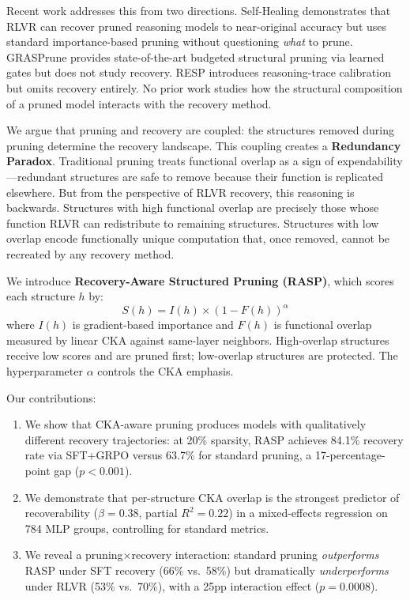 \documentclass[11pt,a4paper]{article}
\newcommand{\method}{RASP}
\newcommand{\score}{S(h)}
\newcommand{\importance}{I(h)}
\newcommand{\overlap}{F(h)}
\begin{document}
Recent work addresses this from two directions. Self-Healing \cite{selfhealing2025} demonstrates that RLVR can recover pruned reasoning models to near-original accuracy but uses standard importance-based pruning without questioning \emph{what} to prune. GRASPrune \cite{graspprune2026} provides state-of-the-art budgeted structural pruning via learned gates but does not study recovery. RESP \cite{resp2025} introduces reasoning-trace calibration but omits recovery entirely. No prior work studies how the structural composition of a pruned model interacts with the recovery method.

We argue that pruning and recovery are coupled: the structures removed during pruning determine the recovery landscape. This coupling creates a \textbf{Redundancy Paradox}. Traditional pruning treats functional overlap as a sign of expendability---redundant structures are safe to remove because their function is replicated elsewhere. But from the perspective of RLVR recovery, this reasoning is backwards. Structures with high functional overlap are precisely those whose function RLVR can redistribute to remaining structures. Structures with low overlap encode functionally unique computation that, once removed, cannot be recreated by any recovery method.

We introduce \textbf{Recovery-Aware Structured Pruning (\method{})}, which scores each structure $h$ by:
\begin{equation}
\score{} = \importance{} \times (1 - \overlap{})^\alpha
\label{eq:rasp}
\end{equation}
where $\importance{}$ is gradient-based importance and $\overlap{}$ is functional overlap measured by linear CKA against same-layer neighbors. High-overlap structures receive low scores and are pruned first; low-overlap structures are protected. The hyperparameter $\alpha$ controls the CKA emphasis.

Our contributions:
\begin{enumerate}
\item We show that CKA-aware pruning produces models with qualitatively different recovery trajectories: at 20\% sparsity, \method{} achieves 84.1\% recovery rate via SFT+GRPO versus 63.7\% for standard pruning, a 17-percentage-point gap ($p < 0.001$).
\item We demonstrate that per-structure CKA overlap is the strongest predictor of recoverability ($\beta = 0.38$, partial $R^2 = 0.22$) in a mixed-effects regression on 784 MLP groups, controlling for standard metrics.
\item We reveal a pruning$\times$recovery interaction: standard pruning \emph{outperforms} \method{} under SFT recovery (66\% vs.\ 58\%) but dramatically \emph{underperforms} under RLVR (53\% vs.\ 70\%), with a 25pp interaction effect ($p = 0.0008$).
\end{enumerate}
\end{document}
